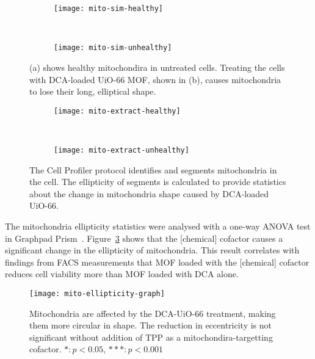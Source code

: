 \begin{figure}[p]
\centering
	\begin{subfigure}[b]{0.49\textwidth}
	\texttt{[image: mito-sim-healthy]}
	\caption{}
	\end{subfigure} ~
	\begin{subfigure}[b]{0.49\textwidth}
	\texttt{[image: mito-sim-unhealthy]}
	\caption{}
	\end{subfigure}
\caption[MOFs: UiO-66 MOF loaded with DCA changes mitochondria's shape]{(a) shows healthy mitochondira in untreated cells. Treating the cells with DCA-loaded UiO-66 MOF, shown in (b), causes mitochondria to lose their long, elliptical shape.  }
\label{fig:mito-SIM-images}
\end{figure}
\begin{figure}[p]
\centering
	\begin{subfigure}[b]{0.49\textwidth}

\texttt{[image: mito-extract-healthy]}
	\caption{}
	\end{subfigure} ~
	\begin{subfigure}[b]{0.49\textwidth}
	\texttt{[image: mito-extract-unhealthy]}
	\caption{}
	\end{subfigure}
\caption[MOFs: Mitochondria segmentation in Cell Profiler allow statistical shape analysis]{The Cell Profiler\cite{cellprofiler} protocol identifies and segments mitochondria in the cell. The ellipticity of segments is calculated to provide statistics about the change in mitochondria shape caused by DCA-loaded UiO-66. }
\label{fig:cell-profiler-segmentation}
\end{figure}

The mitochondria ellipticity statistics were analysed with a one-way ANOVA test in Graphpad Prism~\cite{graphpadprism}. 
Figure~\ref{fig:mito-ellipticity-graph} shows that the [chemical] cofactor causes a significant change in the ellipticity of mitochondria. 
This result correlates with findings from FACS measurements that MOF loaded with the [chemical] cofactor reduces cell viability more than MOF loaded with DCA alone. 

\begin{figure}[htbp!]
\centering
\texttt{[image: mito-ellipticity-graph]}
\caption[MOFs: Mitochondria become more circular when treated with ] {Mitochondria are affected by the DCA-UiO-66 treatment, making them more circular in shape. The reduction in eccentricity is not significant without addition of TPP as a mitochondira-targetting cofactor. $*: p<0.05$, $***: p<0.001$} 
\label{fig:mito-ellipticity-graph}
\end{figure}


